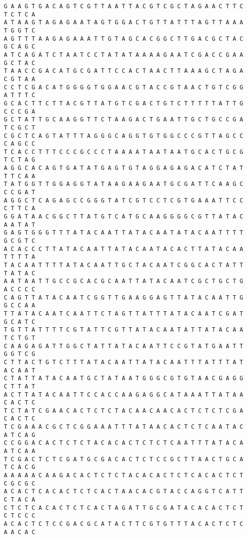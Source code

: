 \documentclass[11pt]{article}
\begin{document}
\begin{Verbatim}[commandchars=\\\{\}]
G A A G T G A C A G T C G T T A A T T A C G T C G C T A G A A C T T C T C T C A
A T A A G T A G A G A A T A G T G G A C T G T T A T T T A G T T A A A T G G T C
A G T T T A A G A G A A A T T G T A G C A C G G C T T G A C G C T A C G C A G C
A T C A G A T C T A A T C C T A T A T A A A A G A A T C G A C C G A A G C T A C
T A A C C G A C A T G C G A T T C C A C T A A C T T A A A G C T A G A C G T A A
C C T C G A C A T G G G G T G G A A C G T A C C G T A A C T G T C G G A T T T C
G C A C T T C T T A C G T T A T G T C G A C T G T C T T T T T A T T G C C C G A
G C T A T T G C A A G G T T C T A A G A C T G A A T T G C T G C C G A T C G C T
C G C T C A G T A T T T A G G G C A G G T G T G G C C C G T T A G C C C A G C C
T C A C C T T T C C C G C C C T A A A A T A A T A A T G C A C T G C G T C T A G
A G G C A C A G T G A T A T G A G T G T A G G A G A G A C A T C T A T T T C A A
T A T G G T T G G A G G T A T A A G A A G A A T G C G A T T C A A G C C C G A T
A G G C T C A G A G C C G G G T A T C G T C C T C G T G A A A T T C C C T T C A
G G A T A A C G G C T T A T G T C A T G C A A G G G G C G T T A T A C A A T A T
G A G T G G G T T T A T A C A A T T A T A C A A T A T A C A A T T T T G C G T C
A C A C C C T T A T A C A A T T A T A C A A T A C A C T T A T A C A A T T T T A
T A C A A T T T T A T A C A A T T G C T A C A A T C G G C A C T A T T T A T A C
A A T A A T T G C C G C A C G C A A T T A T A C A A T C G C T G C T G A C C C C
C A G T T A T A C A A T C G G T T G A A G G A G T T A T A C A A T T G G C C A A
T T A T A C A A T C A A T T C T A G T T A T T T A T A C A A T C G A T G C A T C
T G T T A T T T T C G T A T T C G T T A T A C A A T A T T A T A C A A T C T G T
C A A G A G A T T G G C T A T T A T A C A A T T C C G T A T G A A T T G G T C G
C T T A C T G T C T T T A T A C A A T T A T A C A A T T T A T T T A T A C A A T
C T A T T A T A C A A T G C T A T A A T G G G C G T G T A A C G A G G C T T A T
A C T T A T A C A A T T C C A C C A A G A G G C A T A A A T T A T A A C A C T C
T C T A T C G A A C A C T C T C T A C A A C A A C A C T C T C T C G A C A C T C
T C G A A A C G C T C G G A A A T T T A T A A C A C T C T C A A T A C A T C A G
C C G G A C A C T C T C T A C A C A C T C T C T C A A T T T A T A C A A T C A A
T C G A C T C T C G A T G C G A C A C T C T C C G C T T A A C T G C A T C A C G
A A A A A C A A G A C A C T C T C T A C A C A C T C T C A C A C T C T C G C G C
A C A C T C A C A C T C T C A C T A A C A C G T A C C A G G T C A T T C T A C A
C T C T C A C A C T C T C A C T A G A T T G C G A T A C A C A C T C T C T C C C
A C A C T C T C C G A C G C A T A C T T C G T G T T T A C A C T C T C A A C A C

\end{Verbatim}
\end{document}
